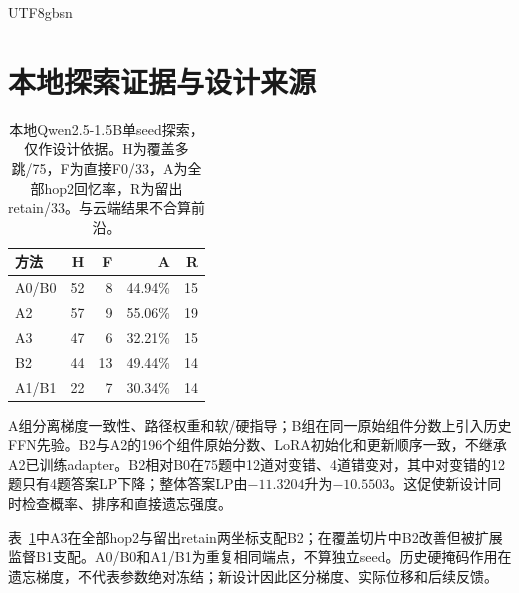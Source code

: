 \documentclass[sigconf,anonymous,review]{acmart}
\begin{document}
\begin{CJK*}{UTF8}{gbsn}
\section{本地探索证据与设计来源}
\begin{table}[ht]
\caption{本地Qwen2.5-1.5B单seed探索，仅作设计依据。H为覆盖多跳/75，F为直接F0/33，A为全部hop2回忆率，R为留出retain/33。与云端结果不合算前沿。}
\label{tab:localhistory}
\centering\small
\begin{tabular}{lrrrr}
\toprule
方法 & H & F & A & R\\
\midrule
A0/B0 & 52 & 8 & 44.94\% & 15\\
A2 & 57 & 9 & 55.06\% & 19\\
A3 & 47 & 6 & 32.21\% & 15\\
B2 & 44 & 13 & 49.44\% & 14\\
A1/B1 & 22 & 7 & 30.34\% & 14\\
\bottomrule
\end{tabular}
\end{table}

A组分离梯度一致性、路径权重和软/硬指导；B组在同一原始组件分数上引入历史FFN先验。B2与A2的196个组件原始分数、LoRA初始化和更新顺序一致，不继承A2已训练adapter。B2相对B0在75题中12道对变错、4道错变对，其中对变错的12题只有4题答案LP下降；整体答案LP由$-11.3204$升为$-10.5503$。这促使新设计同时检查概率、排序和直接遗忘强度。

表~\ref{tab:localhistory}中A3在全部hop2与留出retain两坐标支配B2；在覆盖切片中B2改善但被扩展监督B1支配。A0/B0和A1/B1为重复相同端点，不算独立seed。历史硬掩码作用在遗忘梯度，不代表参数绝对冻结；新设计因此区分梯度、实际位移和后续反馈。


\end{CJK*}
\end{document}
